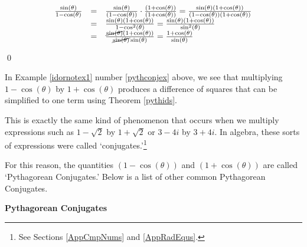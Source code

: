 \documentclass{ximera}
\begin{document}
\begin{example}
\begin{enumerate}
\[ \begin{array}{rcl}


\frac{\sin(\theta)}{1 - \cos(\theta)} & = & \frac{\sin(\theta)}{(1 - \cos(\theta))} \cdot \frac{(1 + \cos(\theta))}{(1 + \cos(\theta))} = \frac{\sin(\theta)(1 + \cos(\theta))}{(1 - \cos(\theta))(1 + \cos(\theta))} \\  
& = & \frac{\sin(\theta)(1 + \cos(\theta))}{1 - \cos^{2}(\theta)} = \frac{\sin(\theta)(1 + \cos(\theta))}{\sin^{2}(\theta)} \\  
& = & \frac{\cancel{\sin(\theta)}(1 + \cos(\theta))}{\cancel{\sin(\theta)}\sin(\theta)} = \frac{1 + \cos(\theta)}{\sin(\theta)} \end{array} \]

\vspace{-.1in} \qed

\end{enumerate}

\end{example}

In Example \ref{idornotex1} number \ref{pythconjex} above,  we see that multiplying  $1-\cos(\theta)$ by $1+\cos(\theta)$ produces a difference of squares that can be simplified to one term using Theorem \ref{pythids}.  

\smallskip

This is exactly the same kind of phenomenon that occurs when we multiply expressions such as $1 - \sqrt{2}$ by $1+\sqrt{2}$ or $3 - 4i$ by $3+4i$. In algebra, these sorts of expressions were called `conjugates.'\footnote{See Sections  \ref{AppCmpNums} and \ref{AppRadEqus}.}  

\smallskip

For this reason, the quantities $(1-\cos(\theta))$ and $(1+\cos(\theta))$ are called `Pythagorean Conjugates.'  Below is a list of other common Pythagorean Conjugates.  

\smallskip

\label{PythagoreanConjugates}
\smallskip

\smallskip

\centerline{\textbf{Pythagorean Conjugates}}  
\end{document}

